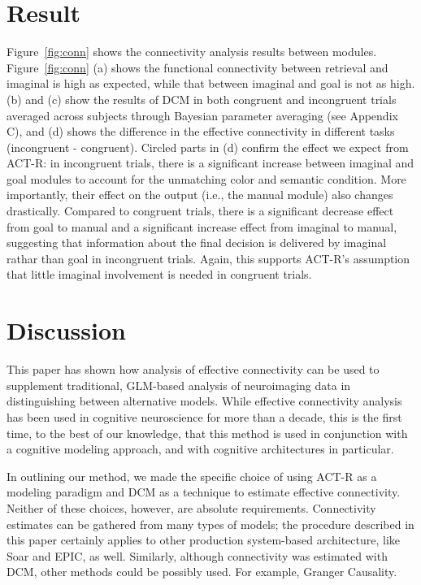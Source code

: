 \documentclass[10pt,letterpaper]{article}
\begin{document}
\section{Result}

Figure~\ref{fig:conn} shows the connectivity analysis results between modules. Figure~\ref{fig:conn} (a) shows the functional connectivity between retrieval and imaginal is high as expected, while that between imaginal and goal is not as high. (b) and (c) show the results of DCM in both congruent and incongruent trials averaged across subjects through Bayesian parameter averaging \cite{Kasess2010} (see Appendix C), and (d) shows the difference in the effective connectivity in different tasks (incongruent - congruent). Circled parts in (d) confirm the effect we expect from ACT-R: in incongruent trials, there is a significant increase between imaginal and goal modules to account for the unmatching color and semantic condition. More importantly, their effect on the output (i.e., the manual module) also changes drastically. Compared to congruent trials, there is a significant decrease effect from goal to manual and a significant increase effect from imaginal to manual, suggesting that information about the final decision is delivered by imaginal rathar than goal in incongruent trials. Again, this supports ACT-R's assumption that little imaginal involvement is needed in congruent trials. 

\section{Discussion}

This paper has shown how analysis of effective connectivity can be used to supplement traditional, GLM-based analysis of neuroimaging data in distinguishing between alternative models. While effective connectivity analysis has been used in cognitive neuroscience for more than a decade, this is the first time, to the best of our knowledge, that this method is used in conjunction with a cognitive modeling approach, and with cognitive architectures in particular.

In outlining our method, we made the specific choice of using ACT-R as a modeling paradigm and DCM as a technique to estimate effective connectivity. Neither of these choices, however, are absolute requirements. Connectivity estimates can be gathered from many types of models; the procedure described in this paper certainly applies to other production system-based architecture, like Soar and EPIC, as well. Similarly, although connectivity was estimated with DCM,  other methods could be possibly used. For example, Granger Causality. %
\end{document}
